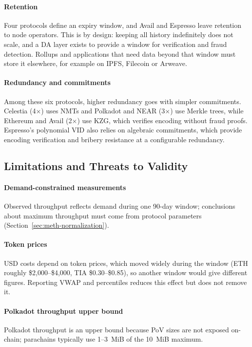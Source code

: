 \paragraph{Retention}
Four protocols define an expiry window, and Avail and Espresso leave retention to node operators.
This is by design: keeping all history indefinitely does not scale, and a DA layer exists to provide a window for verification and fraud detection.
Rollups and applications that need data beyond that window must store it elsewhere, for example on IPFS, Filecoin or Arweave.

\paragraph{Redundancy and commitments}
Among these six protocols, higher redundancy goes with simpler commitments.
Celestia (4$\times$) uses NMTs and Polkadot and NEAR (3$\times$) use Merkle trees, while Ethereum and Avail (2$\times$) use KZG, which verifies encoding without fraud proofs.
Espresso's polynomial VID also relies on algebraic commitments, which provide encoding verification and bribery resistance at a configurable redundancy.

\subsection{Limitations and Threats to Validity}
\label{sec:disc-limitations}

\paragraph{Demand-constrained measurements}
Observed throughput reflects demand during one 90-day window; conclusions about maximum throughput must come from protocol parameters (Section~\ref{sec:meth-normalization}).

\paragraph{Token prices}
USD costs depend on token prices, which moved widely during the window (ETH roughly \$2,000--\$4,000, TIA \$0.30--\$0.85), so another window would give different figures.
Reporting VWAP and percentiles reduces this effect but does not remove it.

\paragraph{Polkadot throughput upper bound}
Polkadot throughput is an upper bound because PoV sizes are not exposed on-chain; parachains typically use 1--3~MiB of the 10~MiB maximum.

